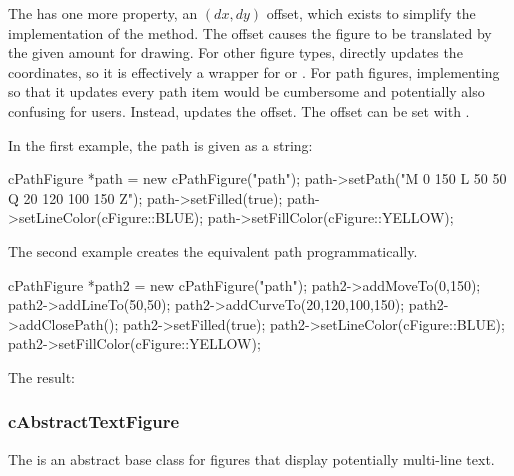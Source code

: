 The  has one more property, an $(dx,dy)$ offset, which
exists to simplify the implementation of the  method. The offset
causes the figure to be translated by the given amount for drawing. For
other figure types,  directly updates the coordinates, so it
is effectively a wrapper for  or .
For path figures, implementing  so that it updates every path
item would be cumbersome and potentially also confusing for users. Instead,
 updates the offset. The offset can be set with
.

In the first example, the path is given as a string:


\begin{cpp}
cPathFigure *path = new cPathFigure("path");
path->setPath("M 0 150 L 50 50 Q 20 120 100 150 Z");
path->setFilled(true);
path->setLineColor(cFigure::BLUE);
path->setFillColor(cFigure::YELLOW);
\end{cpp}


The second example creates the equivalent path programmatically.

\begin{cpp}
cPathFigure *path2 = new cPathFigure("path");
path2->addMoveTo(0,150);
path2->addLineTo(50,50);
path2->addCurveTo(20,120,100,150);
path2->addClosePath();
path2->setFilled(true);
path2->setLineColor(cFigure::BLUE);
path2->setFillColor(cFigure::YELLOW);
\end{cpp}


The result:

\begin{center}

\end{center}

\subsubsection{cAbstractTextFigure}
\label{sec:graphics:abstracttextfigure}

The  is an abstract base class for figures that
display potentially multi-line text.

